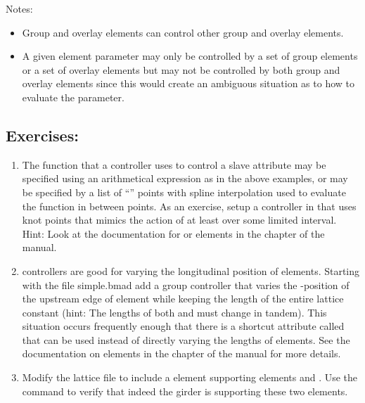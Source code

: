 \documentclass{hitec}     %
\begin{document}
{{{{Notes:
\vspace{-5 pt}
\begin{itemize}[leftmargin=*]
\item
Group and overlay elements can control other group and overlay elements.
\item
A given element parameter may only be controlled by a set of group elements or a set of overlay
elements but may not be controlled by both group and overlay elements since this would create
an ambiguous situation as to how to evaluate the parameter.
\end{itemize}

\subsection{Exercises:}

\begin{enumerate}[leftmargin=*]
\item 
The function that a controller uses to control a slave attribute may be specified using an
arithmetical expression as in the above examples, or may be specified by a list of ``''
points with spline interpolation used to evaluate the function in between points.  As an exercise,
setup a controller in  that uses knot points that mimics the action of  at least over some
limited interval. Hint: Look at the documentation for  or  elements in the
 chapter of the \bmad manual.
%
\item
{} controllers are good for varying the longitudinal position of elements. Starting with the
file simple.bmad add a group controller that varies the -position of the upstream edge of
element  while keeping the length of the entire lattice constant (hint: The lengths of both
 and  must change in tandem). This situation occurs frequently enough that there is a
shortcut attribute called  that can be used instead of directly varying the lengths
of elements. See the documentation on  elements in the 
chapter of the \bmad manual for more details.
%
\item
Modify the lattice file  to include a  element supporting elements 
and . Use the  command to verify that indeed the girder is supporting these two
elements.
\end{enumerate}

}}}}
\end{document}
